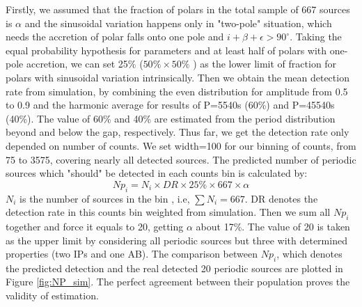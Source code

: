 \documentclass[fleqn,usenatbib]{mnras}
\begin{document}
Firstly, we assumed that the fraction of polars in the total sample of 667 sources is $\alpha$ and the sinusoidal variation happens only in "two-pole" situation, which needs the accretion of polar falls onto one pole and $i+\beta+\epsilon > 90^{\circ}$. 
Taking the equal probability hypothesis for parameters and at least half of polars with one-pole accretion, we can set 25\% ($50\% \times 50\%$ ) as the lower limit of fraction for polars with sinusoidal variation intrinsically.
Then we obtain the mean detection rate from simulation, by combining the even distribution for amplitude from 0.5 to 0.9 and the harmonic average for results of P=5540s (60\%) and P=45540s (40\%). The value of 60\% and 40\% are estimated from the period distribution beyond and below the gap, respectively. Thus far, we get the detection rate only depended on number of counts.
We set width=100 for our binning of counts, from 75 to 3575, covering nearly all detected sources. 
 The predicted number of periodic sources which "should" be detected in each counts bin is calculated by:
\begin{equation}
Np_{i}=N_i\times DR \times 25\% \times 667 \times \alpha	
\end{equation}
$N_i$ is the number of sources in the bin , i.e, $\sum{N_i}=667$. DR denotes the detection rate in this counts bin weighted from simulation. Then we sum all $Np_{i}$ together and force it equals to 20, getting $\alpha$ about 17\%. The value of 20 is taken as the upper limit by considering all periodic sources but three with determined properties (two IPs and one AB).
 The comparison between $Np_{i}$, which denotes the predicted detection and the real detected 20 periodic sources are plotted in Figure \ref{fig:NP_sim}. The perfect agreement between their population proves the validity of estimation.
\end{document}

